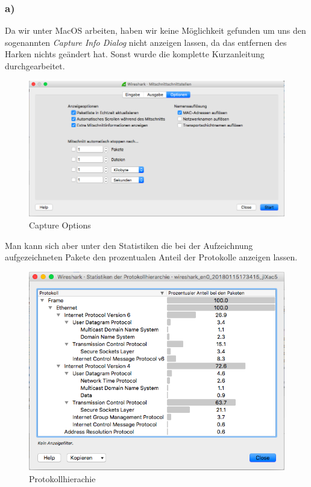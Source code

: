 \subsubsection{a)}
Da wir unter MacOS arbeiten, haben wir keine Möglichkeit gefunden um uns den sogenannten \textit{Capture Info Dialog} nicht anzeigen lassen, da das entfernen des Harken nichts geändert hat. Sonst wurde die komplette Kurzanleitung durchgearbeitet.
\begin{figure}[H]
	\centering
	\includegraphics[width=0.8 \linewidth]{images/w01}
	\caption{Capture Options} \label{ordner}
\end{figure} 
Man kann sich aber unter den Statistiken die bei der Aufzeichnung aufgezeichneten Pakete den prozentualen Anteil der Protokolle anzeigen lassen.
\begin{figure}[H]
	\centering
	\includegraphics[width=0.7 \linewidth]{images/w02}
	\caption{Protokollhierachie} \label{ordner}
\end{figure} 

